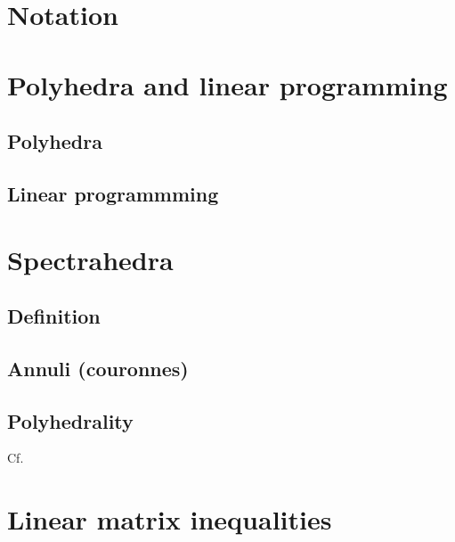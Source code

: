 \documentclass[a4paper,12pt]{article}
\begin{document}
\section{Notation}

\section{Polyhedra and linear programming}

\subsection{Polyhedra}
\subsection{Linear programmming}

\section{Spectrahedra}

\subsection{Definition}
\subsection{Annuli (couronnes)}
\subsection{Polyhedrality}
Cf. \cite{bhardwaj2015deciding}

\section{Linear matrix inequalities}


\printbibliography
\end{document}
